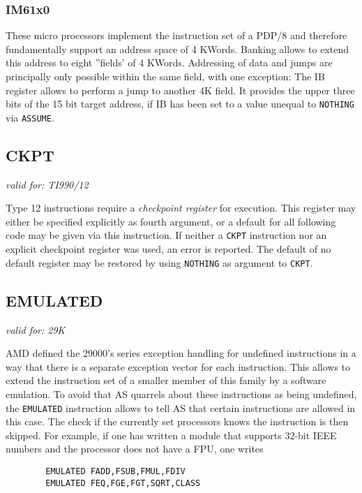 \documentclass[12pt,twoside]{report}
\makeatletter
\newcommand{\tty}[1]{{\tt #1}}
\newcommand{\ttindex}[1]{\index{#1@{\tt #1}}}
\newcommand{\asname}{{AS}}
\makeatother
\begin{document}

\subsubsection{IM61x0}

These micro processors implement the instruction set of a PDP/8 and therefore
fundamentally support an address space of 4 KWords. Banking allows to extend this
address to eight ''fields' of 4 KWords. Addressing of data and jumps are principally
only possible within the same field, with one exception: The IB register allows
to perform a jump to another 4K field.  It provides the upper three bits of the
15 bit target address, if IB has been set to a value unequal to \tty{NOTHING} via
\tty{ASSUME}.


\subsection{CKPT}
\ttindex{CKPT}

{\em valid for: TI990/12}

Type 12 instructions require a {\em checkpoint register} for execution.  This
register may either be specified explicitly as fourth argument, or a default for
all following code may be given via this instruction.  If neither a \tty{CKPT}
instruction nor an explicit checkpoint register was used, an error
is reported.  The default of no default register may be restored by using
{\tt NOTHING} as argument to \tty{CKPT}.


\subsection{EMULATED}

{\em valid for: 29K}

AMD defined the 29000's series exception handling for undefined
instructions in a way that there is a separate exception vector for
each instruction.  This allows to extend the instruction set of a
smaller member of this family by a software emulation.  To avoid that
\asname{} quarrels about these instructions as being undefined, the
\tty{EMULATED} instruction allows to tell \asname{} that certain instructions are
allowed in this case.  The check if the currently set processors knows the
instruction is then skipped.  For example, if one has written a module
that supports 32-bit IEEE numbers and the processor does not have a FPU,
one writes
\begin{verbatim}
        EMULATED FADD,FSUB,FMUL,FDIV
        EMULATED FEQ,FGE,FGT,SQRT,CLASS
\end{verbatim}
\end{document}
